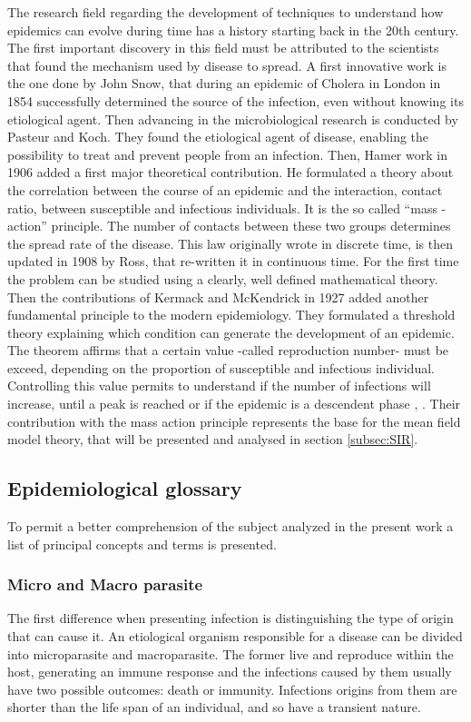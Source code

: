 The research field regarding the development of techniques to understand how epidemics can evolve during time has a history starting back in the 20th century. The first important discovery in this field must be attributed to the scientists that found the mechanism used by disease to spread. 
A first innovative work is the one done by John Snow, that during an epidemic of Cholera in London in 1854 successfully determined the source of the infection, even without knowing its etiological agent. Then advancing in the microbiological research is conducted by Pasteur and Koch. They found the etiological agent of disease, enabling the possibility to treat and prevent people from an infection. 
Then, Hamer work in 1906 added a first major theoretical contribution. He formulated a theory about the correlation between the course of an epidemic and the interaction, contact ratio, between susceptible and infectious individuals. It is the so called “mass -action” principle. The number of contacts between these two groups determines the spread rate of the disease. 
This law originally wrote in discrete time, is then updated in 1908 by Ross, that re-written it  in continuous time. For the first time the problem can be studied using a clearly, well defined mathematical theory. Then the contributions of Kermack and McKendrick in 1927 added another fundamental principle to the modern epidemiology. They formulated a threshold theory explaining which condition can generate the development of an epidemic. The theorem affirms that a certain value -called reproduction number- must be exceed, depending on the proportion of susceptible and infectious individual. Controlling this value permits to understand if the number of infections will increase, until a peak is reached or if the epidemic is a descendent phase \cite{Mata2021}, \cite{Anderson_82}. 
Their contribution with the mass action principle represents the base for the mean field model theory, that will be presented and analysed in section \ref{subsec:SIR}. 



\subsection{Epidemiological glossary}
To permit a better comprehension of the subject analyzed in the present work a list of principal concepts and terms is presented.

\subsubsection{Micro and Macro parasite}
	The first difference when presenting infection is distinguishing the type of origin that can cause it. An etiological organism responsible for a disease can be divided into microparasite and macroparasite. The former live and reproduce within the host, generating an immune response and the infections caused by them usually have two possible outcomes: death or immunity. Infections origins from them are shorter than the life span of an individual, and so have a transient nature.
